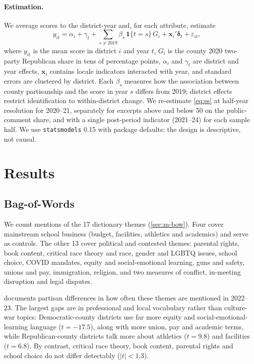 \documentclass[12pt]{article}
\begin{document}
\paragraph{Estimation.}
We average scores to the district-year and, for each attribute, estimate
\begin{equation}
  y_{it}=\alpha_i+\gamma_t+\sum_{s\neq 2019}\beta_s\,
  \mathbf{1}\{t=s\}\,G_i+\mathbf{x}_i'\boldsymbol{\delta}_t+\varepsilon_{it},
  \label{eq:es}
\end{equation}
where $y_{it}$ is the mean score in district $i$ and year $t$, $G_i$ is the county 2020 two-party Republican share in tens of percentage points, $\alpha_i$ and $\gamma_t$ are district and year effects, $\mathbf{x}_i$ contains locale indicators interacted with year, and standard errors are clustered by district. Each $\beta_s$ measures how the association between county partisanship and the score in year $s$ differs from 2019; district effects restrict identification to within-district change. We re-estimate \cref{eq:es} at half-year resolution for 2020--21, separately for excerpts above and below 50 on the public-comment share, and with a single post-period indicator (2021--24) for each sample half. We use \texttt{statsmodels} 0.15 with package defaults; the design is descriptive, not causal.
\section{Results}\label{sec:results}

\subsection{Bag-of-Words}\label{sec:r-bow}

We count mentions of the 17 dictionary themes (\cref{sec:m-bow}). Four cover
mainstream school business (budget, facilities, athletics and academics) and serve
as controls. The other 13 cover political and contested themes: parental rights, book content, critical race theory and race,
gender and LGBTQ issues, school choice, COVID mandates, equity and social-emotional
learning, guns and safety, unions and pay, immigration, religion, and two measures of
conflict, in-meeting disruption and legal disputes.

 documents partisan differences in how often these themes are
mentioned in 2022--23. The largest gaps are in professional and local vocabulary
rather than culture-war topics: Democratic-county districts use far more equity and
social-emotional-learning language ($t=-17.5$), along with more union, pay and
academic terms, while Republican-county districts talk more about athletics
($t=9.8$) and facilities ($t=6.8$). By contrast, critical race theory, book content,
parental rights and school choice do not differ detectably ($|t|<1.3$).
\end{document}
